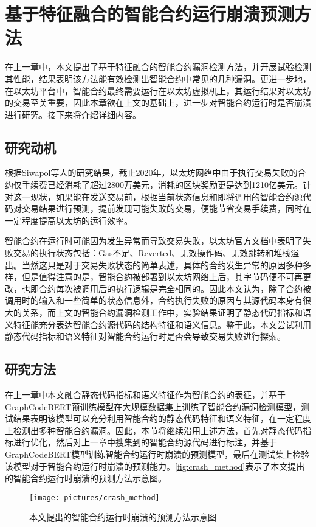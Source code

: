 \chapter{基于特征融合的智能合约运行崩溃预测方法}
在上一章中，本文提出了基于特征融合的智能合约漏洞检测方法，并开展试验检测其性能，结果表明该方法能有效检测出智能合约中常见的几种漏洞。更进一步地，在以太坊平台中，智能合约最终需要运行在以太坊虚拟机上，其运行结果对以太坊的交易至关重要，因此本章欲在上文的基础上，进一步对智能合约运行时是否崩溃进行研究。接下来将介绍详细内容。
\section{研究动机}
\label{sec:研究动机}
根据Siwapol等人的研究结果\cite{reducing2020}，截止2020年，以太坊网络中由于执行交易失败的合约仅手续费已经消耗了超过2800万美元，消耗的区块奖励更是达到1210亿美元。针对这一现状，如果能在发送交易前，根据当前状态信息和即将调用的智能合约源代码对交易结果进行预测，提前发现可能失败的交易，便能节省交易手续费，同时在一定程度提高以太坊的运行效率。

智能合约在运行时可能因为发生异常而导致交易失败，以太坊官方文档中表明了失败交易的执行状态包括：Gas不足、Reverted、无效操作码、无效跳转和堆栈溢出。当然这只是对于交易失败状态的简单表述，具体的合约发生异常的原因多种多样，但是值得注意的是，智能合约被部署到以太坊网络上后，其字节码便不可再更改，也即合约每次被调用后的执行逻辑是完全相同的。因此本文认为，除了合约被调用时的输入和一些简单的状态信息外，合约执行失败的原因与其源代码本身有很大的关系，而上文的智能合约漏洞检测工作中，实验结果证明了静态代码指标和语义特征能充分表达智能合约源代码的结构特征和语义信息。鉴于此，本文尝试利用静态代码指标和语义特征对智能合约运行时是否会导致交易失败进行探索。

\section{研究方法}
\label{sec:研究方法}
在上一章中本文融合静态代码指标和语义特征作为智能合约的表征，并基于GraphCodeBERT预训练模型在大规模数据集上训练了智能合约漏洞检测模型，测试结果表明该模型可以充分利用智能合约的静态代码特征和语义特征，在一定程度上检测出多种智能合约漏洞。因此，本节将继续沿用上述方法，首先对静态代码指标进行优化，然后对上一章中搜集到的智能合约源代码进行标注，并基于GraphCodeBERT模型训练智能合约运行时崩溃的预测模型，最后在测试集上检验该模型对于智能合约运行时崩溃的预测能力。\autoref{fig:crash_method}表示了本文提出的智能合约运行时崩溃的预测方法示意图。
\begin{figure}[htbp]
    \centering
    \texttt{[image: pictures/crash\_method]}
    \caption{\label{fig:crash_method}本文提出的智能合约运行时崩溃的预测方法示意图}
\end{figure}
